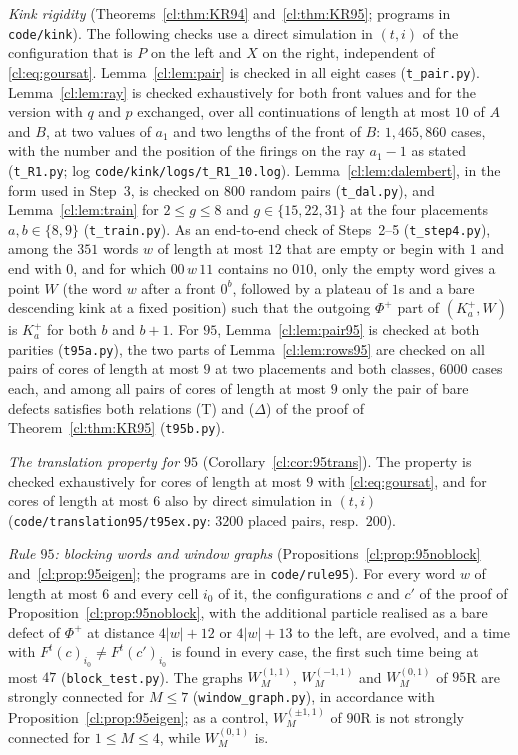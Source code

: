 \emph{Kink rigidity} (Theorems~\ref{cl:thm:KR94} and~\ref{cl:thm:KR95}; programs in \texttt{code/kink}). The following checks use a direct simulation in $(t,i)$ of the configuration that is $P$ on the left and $X$ on the right, independent of \eqref{cl:eq:goursat}. Lemma~\ref{cl:lem:pair} is checked in all eight cases (\texttt{t\_pair.py}). Lemma~\ref{cl:lem:ray} is checked exhaustively for both front values and for the version with $q$ and $p$ exchanged, over all continuations of length at most $10$ of $A$ and $B$, at two values of $a_1$ and two lengths of the front of $B$: $1{,}465{,}860$ cases, with the number and the position of the firings on the ray $a_1-1$ as stated (\texttt{t\_R1.py}; log \texttt{code/kink/logs/t\_R1\_10.log}). Lemma~\ref{cl:lem:dalembert}, in the form used in Step~3, is checked on $800$ random pairs (\texttt{t\_dal.py}), and Lemma~\ref{cl:lem:train} for $2\le g\le8$ and $g\in\{15,22,31\}$ at the four placements $a,b\in\{8,9\}$ (\texttt{t\_train.py}). As an end-to-end check of Steps~2--5 (\texttt{t\_step4.py}), among the $351$ words $w$ of length at most $12$ that are empty or begin with $1$ and end with $0$, and for which $00\,w\,11$ contains no $010$, only the empty word gives a point $W$ (the word $w$ after a front $0^b$, followed by a plateau of $1$s and a bare descending kink at a fixed position) such that the outgoing $\Phi^+$ part of $(K^+_a,W)$ is $K^+_a$ for both $b$ and $b+1$. For $95$, Lemma~\ref{cl:lem:pair95} is checked at both parities (\texttt{t95a.py}), the two parts of Lemma~\ref{cl:lem:rows95} are checked on all pairs of cores of length at most $9$ at two placements and both classes, $6000$ cases each, and among all pairs of cores of length at most $9$ only the pair of bare defects satisfies both relations (T) and ($\Delta$) of the proof of Theorem~\ref{cl:thm:KR95} (\texttt{t95b.py}).

\emph{The translation property for $95$} (Corollary~\ref{cl:cor:95trans}). The property is checked exhaustively for cores of length at most $9$ with \eqref{cl:eq:goursat}, and for cores of length at most $6$ also by direct simulation in $(t,i)$ (\texttt{code/translation95/t95ex.py}: $3200$ placed pairs, resp.\ $200$).

\emph{Rule $95$: blocking words and window graphs} (Propositions~\ref{cl:prop:95noblock} and~\ref{cl:prop:95eigen}; the programs are in \texttt{code/rule95}). For every word $w$ of length at most $6$ and every cell $i_0$ of it, the configurations $c$ and $c'$ of the proof of Proposition~\ref{cl:prop:95noblock}, with the additional particle realised as a bare defect of $\Phi^+$ at distance $4|w|+12$ or $4|w|+13$ to the left, are evolved, and a time with $F^t(c)_{i_0}\ne F^t(c')_{i_0}$ is found in every case, the first such time being at most $47$ (\texttt{block\_test.py}). The graphs $W^{(1,1)}_M$, $W^{(-1,1)}_M$ and $W^{(0,1)}_M$ of $95$R are strongly connected for $M\le7$ (\texttt{window\_graph.py}), in accordance with Proposition~\ref{cl:prop:95eigen}; as a control, $W^{(\pm1,1)}_M$ of $90$R is not strongly connected for $1\le M\le4$, while $W^{(0,1)}_M$ is.

